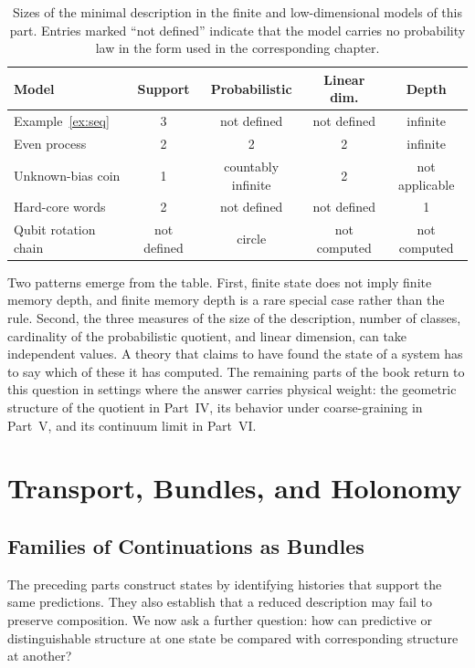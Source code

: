 \documentclass[11pt,oneside]{book}
\theoremstyle{definition}
\theoremstyle{remark}
\begin{document}
\begin{table}[h]
\centering
\begin{tabular}{lcccc}
\hline
Model & Support & Probabilistic & Linear dim. & Depth \\
\hline
Example~\ref{ex:seq} & 3 & not defined & not defined & infinite \\
Even process & 2 & 2 & 2 & infinite \\
Unknown-bias coin & 1 & countably infinite & 2 & not applicable \\
Hard-core words & 2 & not defined & not defined & 1 \\
Qubit rotation chain & not defined & circle & not computed & not computed \\
\hline
\end{tabular}
\caption{Sizes of the minimal description in the finite and low-dimensional models of this part. Entries marked ``not defined'' indicate that the model carries no probability law in the form used in the corresponding chapter.}
\end{table}

Two patterns emerge from the table. First, finite state does not imply finite memory depth, and finite memory depth is a rare special case rather than the rule. Second, the three measures of the size of the description, number of classes, cardinality of the probabilistic quotient, and linear dimension, can take independent values. A theory that claims to have found the state of a system has to say which of these it has computed. The remaining parts of the book return to this question in settings where the answer carries physical weight: the geometric structure of the quotient in Part~IV, its behavior under coarse-graining in Part~V, and its continuum limit in Part~VI.

\part{Transport, Bundles, and Holonomy}

\chapter{Families of Continuations as Bundles}

The preceding parts construct states by identifying histories that
support the same predictions. They also establish that a reduced
description may fail to preserve composition. We now ask a further
question: how can predictive or distinguishable structure at one
state be compared with corresponding structure at another?
\end{document}
